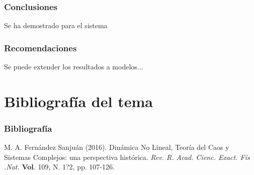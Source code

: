 \documentclass{beamer}
\begin{document}





\begin{frame}
	\frametitle{Conclusiones}
	\begin{minipage}{10cm}
		Se ha demostrado para el sistema
	\end{minipage}
\end{frame}


\begin{frame}
	\frametitle{Recomendaciones}
	\begin{minipage}{10cm}
		Se puede extender los resultados a modelos...
	\end{minipage}
\end{frame}
\section{Bibliograf\'ia del tema}
\begin{frame}
	\frametitle{Bibliograf\'ia}
	\begin{thebibliography}{99}

		 M. A. Fern\'andez Sanju\'an (2016). Din\'amica No Lineal, Teor\'ia del Caos y Sistemas Complejos: una perspectiva hist\'orica. {\em Rev. R. Acad. Cienc. Exact. F\'is .Nat.} \textbf{Vol}. 109, N. 1?2, pp. 107-126.
	\end{thebibliography}
\end{frame}
\end{document}
